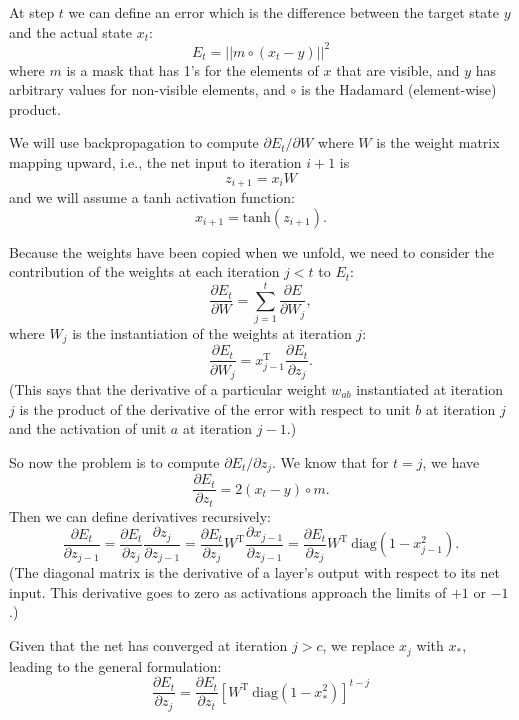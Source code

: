 \documentclass[11pt,letterpaper]{article}
\newcommand{\T}{{\ensuremath{\mathrm{T}}}}
\newcommand{\diag}{{\ensuremath{\mathrm{diag}}}}
\begin{document}
At step $t$ we can define an error which is the difference
between the target state $y$ and the actual state $x_t$:
\[
E_t = || m \circ (x_t - y) ||^2
\]
where $m$ is a mask that has 1's for the elements of $x$ that are visible,
and $y$ has arbitrary values for non-visible elements, and $\circ$ is
the Hadamard (element-wise) product.

We will use backpropagation to compute $\partial E_t / \partial W$ where
$W$ is the weight matrix mapping upward, i.e., the net input to iteration
$i+1$ is 
\[
z_{i+1} = x_i W
\]
and we will assume a tanh activation function:
\[
x_{i+1} = \mathrm{tanh} (z_{i+1}) .
\]

Because the weights have been copied when we unfold, we need to consider
the contribution of the weights at each iteration $j<t$ to $E_t$:
\begin{equation}
\frac{\partial E_t}{\partial W} = \sum_{j=1}^t 
\frac{\partial E}{\partial W_j} ,
\label{eq:dedw}
\end{equation}
where $W_j$ is the instantiation of the weights at iteration $j$:
\begin{equation}
\frac{\partial E_t}{\partial W_j} = 
x_{j-1}^{\T}\frac{\partial E_t}{\partial z_j}  .
\label{eq:dedwj}
\end{equation}
(This says that the derivative of a particular weight $w_{ab}$ instantiated
at iteration $j$ is the product
of the derivative of the error with respect to unit $b$ at iteration $j$
and the activation of unit $a$ at iteration $j-1$.)

So now the problem is to compute $\partial E_t / \partial z_j$. We know that
for $t=j$, we have
\[
\frac{\partial E_t}{\partial z_t} = 2 (x_t - y) \circ m .
\]
Then we can define derivatives recursively:
\[
\frac{\partial E_t}{\partial z_{j-1}} 
   = \frac{\partial E_t}{\partial z_j} 
     \frac{\partial z_j}{\partial z_{j-1}}
   = \frac{\partial E_t}{\partial z_j} 
     W^{\T}
     \frac{\partial x_{j-1}}{\partial z_{j-1}} 
   = \frac{\partial E_t}{\partial z_j} 
     W^{\T} ~\diag(1-x_{j-1}^2) .
\]
(The diagonal matrix is the derivative of a layer's output with respect to
its net input. This derivative goes to zero as activations approach the limits
of $+1$ or $-1$.)

Given that the net has converged at iteration $j > c$, we replace $x_j$ with
$x_*$, leading to the general formulation:
\begin{equation}
\frac{\partial E_t}{\partial z_j} = 
\frac{\partial E_t}{\partial z_t}  
\left[ W^{\T} ~\diag (1-x_*^2)  \right] ^{t-j}
\label{eq:dedz}
\end{equation}
\end{document}
